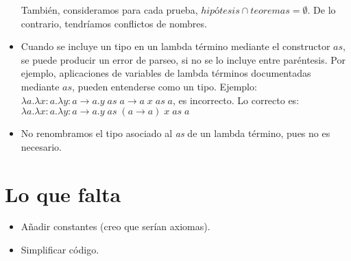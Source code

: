 \documentclass[a4paper,11pt]{article}
\theoremstyle{definition}
\begin{document}
\begin{itemize}
  También, consideramos para cada prueba, $hipótesis \cap teoremas = \emptyset$. De lo contrario, tendríamos conflictos de nombres.
  
  \item Cuando se incluye un tipo en un lambda término mediante el constructor $as$, se puede producir un error de parseo, si no se lo
  incluye entre paréntesis. Por ejemplo, aplicaciones de variables de lambda términos documentadas mediante $as$, pueden entenderse
  como un tipo. Ejemplo: $\lambda a.\lambda x:a. \lambda y:a \rightarrow a. y \; as \; a \rightarrow a \; x \; as \; a$,
  es incorrecto. Lo correcto es: $\lambda a.\lambda x:a. \lambda y:a \rightarrow a. y \; as \; (a \rightarrow a) \; x \; as \; a$
  
  \item No renombramos el tipo asociado al \textit{as} de un lambda término, pues no es necesario.
  

\end{itemize}

\section{Lo que falta}
\begin{itemize}
%   
  \item Añadir constantes (creo que serían axiomas).
  
  \item Simplificar código.
\end{itemize}
\end{document}
